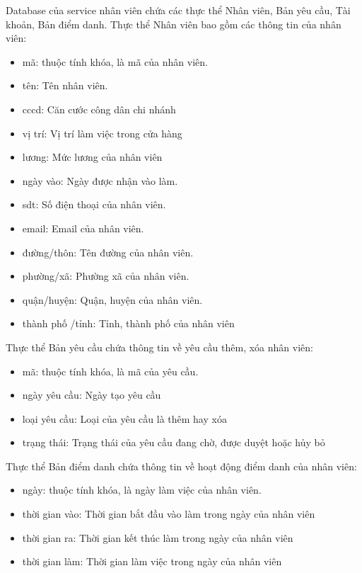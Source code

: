 Database của service nhân viên chứa các thực thể Nhân viên, Bản yêu cầu, Tài khoản, Bản điểm danh. Thực thể Nhân viên bao gồm các thông tin của nhân viên:
\begin{itemize}
    \item mã: thuộc tính khóa, là mã của nhân viên.
    \item tên: Tên nhân viên.
    \item cccd: Căn cước công dân chi nhánh
    \item vị trí: Vị trí làm việc trong cửa hàng
    \item lương: Mức lương của nhân viên
    \item ngày vào: Ngày được nhận vào làm.
    \item sdt: Số điện thoại của nhân viên.
    \item email: Email của nhân viên.
    \item đường/thôn: Tên đường của nhân viên.
    \item phường/xã: Phường xã của nhân viên.
    \item quận/huyện: Quận, huyện của nhân viên.
    \item thành phố /tỉnh: Tỉnh, thành phố của nhân viên
\end{itemize}

Thực thể Bản yêu cầu chứa thông tin về yêu cầu thêm, xóa nhân viên:
\begin{itemize}
    \item mã: thuộc tính khóa, là mã của yêu cầu.
    \item ngày yêu cầu: Ngày tạo yêu cầu
    \item loại yêu cầu: Loại của yêu cầu là thêm hay xóa
    \item trạng thái: Trạng thái của yêu cầu đang chờ, được duyệt hoặc hủy bỏ
\end{itemize}

Thực thể Bản điểm danh chứa thông tin về hoạt động điểm danh của nhân viên:
\begin{itemize}
    \item ngày: thuộc tính khóa, là ngày làm việc của nhân viên.
    \item thời gian vào: Thời gian bắt đầu vào làm trong ngày của nhân viên
    \item thời gian ra: Thời gian kết thúc làm trong ngày của nhân viên
    \item thời gian làm: Thời gian làm việc trong ngày của nhân viên
\end{itemize}

